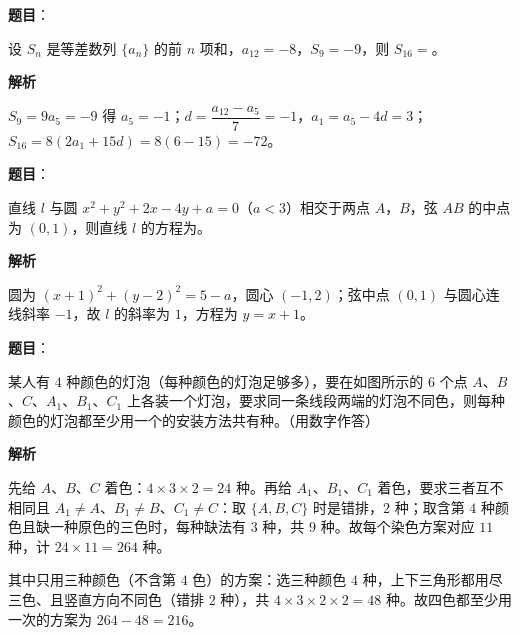 \begin{answer}

\textbf{题目}：

设 $S_n$ 是等差数列 $\{a_n\}$ 的前 $n$ 项和，$a_{12}=-8$，$S_9=-9$，则 $S_{16}=$\gkblank{}。

\textbf{解析}

$S_9=9a_5=-9$ 得 $a_5=-1$；$d=\dfrac{a_{12}-a_5}7=-1$，$a_1=a_5-4d=3$；$S_{16}=8(2a_1+15d)=8(6-15)=-72$。


\end{answer}
\begin{answer}

\textbf{题目}：

直线 $l$ 与圆 $x^2+y^2+2x-4y+a=0$（$a<3$）相交于两点 $A$，$B$，弦 $AB$ 的中点为 $(0,1)$，则直线 $l$ 的方程为\gkblank{}。

\textbf{解析}

圆为 $(x+1)^2+(y-2)^2=5-a$，圆心 $(-1,2)$；弦中点 $(0,1)$ 与圆心连线斜率 $-1$，故 $l$ 的斜率为 $1$，方程为 $y=x+1$。


\end{answer}
\begin{answer}

\textbf{题目}：

某人有 $4$ 种颜色的灯泡（每种颜色的灯泡足够多），要在如图所示的 $6$ 个点 $A$、$B$、$C$、$A_1$、$B_1$、$C_1$ 上各装一个灯泡，要求同一条线段两端的灯泡不同色，则每种颜色的灯泡都至少用一个的安装方法共有\gkblank{}种。（用数字作答）
\nopagebreak[4]
\begin{center}\end{center}
\nopagebreak[4]
\textbf{解析}

先给 $A$、$B$、$C$ 着色：$4\times3\times2=24$ 种。再给 $A_1$、$B_1$、$C_1$ 着色，要求三者互不相同且 $A_1\neq A$、$B_1\neq B$、$C_1\neq C$：取 $\{A,B,C\}$ 时是错排，$2$ 种；取含第 $4$ 种颜色且缺一种原色的三色时，每种缺法有 $3$ 种，共 $9$ 种。故每个染色方案对应 $11$ 种，计 $24\times11=264$ 种。

其中只用三种颜色（不含第 $4$ 色）的方案：选三种颜色 $4$ 种，上下三角形都用尽三色、且竖直方向不同色（错排 $2$ 种），共 $4\times3\times2\times2=48$ 种。故四色都至少用一次的方案为 $264-48=216$。


\end{answer}
